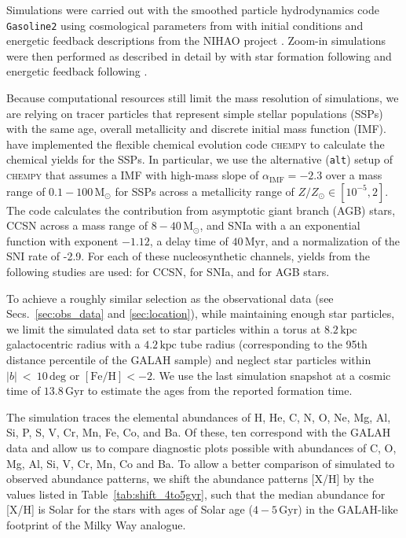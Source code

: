 \documentclass[fleqn,usenatbib]{mnras}
\begin{document}
Simulations were carried out with the smoothed particle hydrodynamics code \texttt{Gasoline2} \citep{Wadsley2017} using cosmological parameters from \citet{Planck2014} with initial conditions and energetic feedback descriptions from the NIHAO project \citep{Wang2015}. Zoom-in simulations were then performed as described in detail by \citet{Buck2021} with star formation following \citet{Stinson2006} and energetic feedback following \citet{Stinson2013}.

Because computational resources still limit the mass resolution of simulations, we are relying on tracer particles that represent simple stellar populations (SSPs) with the same age, overall metallicity and discrete initial mass function (IMF). \citet{Buck2021} have implemented the flexible chemical evolution code \textsc{chempy} \citep{Rybizki2017} to calculate the chemical yields for the SSPs. In particular, we use the alternative (\texttt{alt}) setup of \textsc{chempy} that assumes a \citet{Chabrier2003} IMF with high-mass slope of $\alpha_\text{IMF} = -2.3$ over a mass range of $0.1-100\,\mathrm{M_\odot}$ for SSPs across a metallicity range of $Z/Z_\odot \in [10^{-5},2]$. The code calculates the contribution from asymptotic giant branch (AGB) stars, CCSN across a mass range of $8-40\,\mathrm{M_\odot}$, and SNIa with a an exponential function with exponent $-1.12$, a delay time of $40\,\mathrm{Myr}$, and a normalization of the SNI rate of -2.9. For each of these nucleosynthetic channels, yields from the following studies are used: \citet{Limongi2018} for CCSN, \citet{Seitenzahl2013} for SNIa, and \citet{Karakas2016} for AGB stars.

To achieve a roughly similar selection as the observational data (see Secs.~\ref{sec:obs_data} and \ref{sec:location}), while maintaining enough star particles, we limit the simulated data set to star particles within a torus at $8.2\,\mathrm{kpc}$ galactocentric radius with a $4.2\,\mathrm{kpc}$ tube radius (corresponding to the 95th distance percentile of the GALAH sample) and neglect star particles within $\vert b \vert~<~10\,\mathrm{deg}$ or $\mathrm{[Fe/H]} < -2$. We use the last simulation snapshot at a cosmic time of $13.8\,\mathrm{Gyr}$ to estimate the ages from the reported formation time.

The simulation traces the elemental abundances of H, He, C, N, O, Ne, Mg, Al, Si, P, S, V, Cr, Mn, Fe, Co, and Ba. Of these, ten correspond with the GALAH data and allow us to compare diagnostic plots possible with abundances of C, O, Mg, Al, Si, V, Cr, Mn, Co and Ba. To allow a better comparison of simulated to observed abundance patterns, we shift the abundance patterns [X/H] by the values listed in Table~\ref{tab:shift_4to5gyr}, such that the median abundance for [X/H] is Solar for the stars with ages of Solar age ($4-5\,\mathrm{Gyr}$) in the GALAH-like footprint of the Milky Way analogue.
\end{document}
